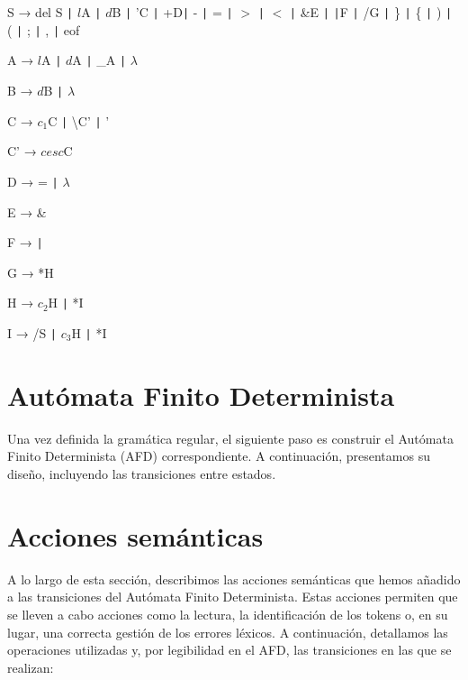 \documentclass{article}
\begin{document}
\begin{tcolorbox}[title=Gramática Regular]
    \hspace{0.5cm} S → del S \texttt{|} $l$A \texttt{|} $d$B \texttt{|} 'C \texttt{|} +D\texttt{|} - \texttt{|} = \texttt{|} \(>\) \texttt{|} \(<\) \texttt{|} \&E \texttt{|} \texttt{|}F \texttt{|} /G \texttt{|} \} \texttt{|} \{ \texttt{|} ) \texttt{|} ( \texttt{|} ; \texttt{|} , \texttt{|} eof
    
    \hspace{0.5cm} A → $l$A \texttt{|} $d$A \texttt{|} \_A \texttt{|} \( \lambda \)
    
    \hspace{0.5cm} B → $d$B \texttt{|} \( \lambda \)
    
    \hspace{0.5cm} C → $c_1$C \texttt{|} \textbackslash C' \texttt{|} '
    
    \hspace{0.5cm} C' → $cesc$C
    
    \hspace{0.5cm} D → = \texttt{|} \( \lambda \)
    
    \hspace{0.5cm} E → \&
    
    \hspace{0.5cm} F → \texttt{|}
    
    \hspace{0.5cm} G → *H
    
    \hspace{0.5cm} H → $c_2$H \texttt{|} *I
    
    \hspace{0.5cm} I → /S \texttt{|} $c_3$H \texttt{|} *I
\end{tcolorbox}

\section{Autómata Finito Determinista}
Una vez definida la gramática regular, el siguiente paso es construir el Autómata Finito Determinista (AFD) correspondiente. A continuación, presentamos su diseño, incluyendo las transiciones entre estados.

\vspace{0.1cm}



\section{Acciones semánticas}
A lo largo de esta sección, describimos las acciones semánticas que hemos añadido a las transiciones del Autómata Finito Determinista. Estas acciones permiten que se lleven a cabo acciones como la lectura, la identificación de los tokens o, en su lugar, una correcta gestión de los errores léxicos. A continuación, detallamos las operaciones utilizadas y, por legibilidad en el AFD, las transiciones en las que se realizan:
\end{document}
